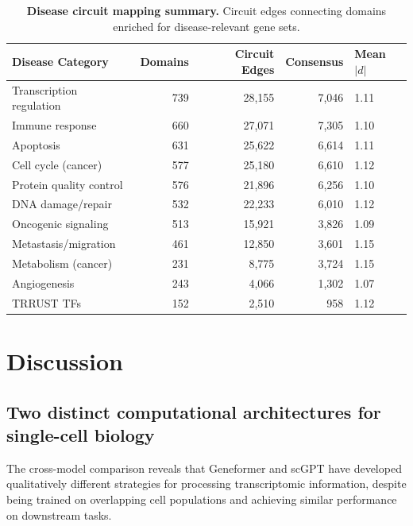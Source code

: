 \documentclass[onecolumn]{article}
\begin{document}
\begin{table}[H]
\centering
\caption{\textbf{Disease circuit mapping summary.} Circuit edges connecting domains enriched for disease-relevant gene sets.}
\label{tab:disease}
\smallskip
\begin{tabular}{lrrrl}
\toprule
Disease Category & Domains & Circuit Edges & Consensus & Mean $|d|$ \\
\midrule
Transcription regulation & 739 & 28,155 & 7,046 & 1.11 \\
Immune response & 660 & 27,071 & 7,305 & 1.10 \\
Apoptosis & 631 & 25,622 & 6,614 & 1.11 \\
Cell cycle (cancer) & 577 & 25,180 & 6,610 & 1.12 \\
Protein quality control & 576 & 21,896 & 6,256 & 1.10 \\
DNA damage/repair & 532 & 22,233 & 6,010 & 1.12 \\
Oncogenic signaling & 513 & 15,921 & 3,826 & 1.09 \\
Metastasis/migration & 461 & 12,850 & 3,601 & 1.15 \\
Metabolism (cancer) & 231 & 8,775 & 3,724 & 1.15 \\
Angiogenesis & 243 & 4,066 & 1,302 & 1.07 \\
TRRUST TFs & 152 & 2,510 & 958 & 1.12 \\
\bottomrule
\end{tabular}
\end{table}


\section{Discussion}

\subsection{Two distinct computational architectures for single-cell biology}

The cross-model comparison reveals that Geneformer and scGPT have developed qualitatively different strategies for processing transcriptomic information, despite being trained on overlapping cell populations and achieving similar performance on downstream tasks.
\end{document}
